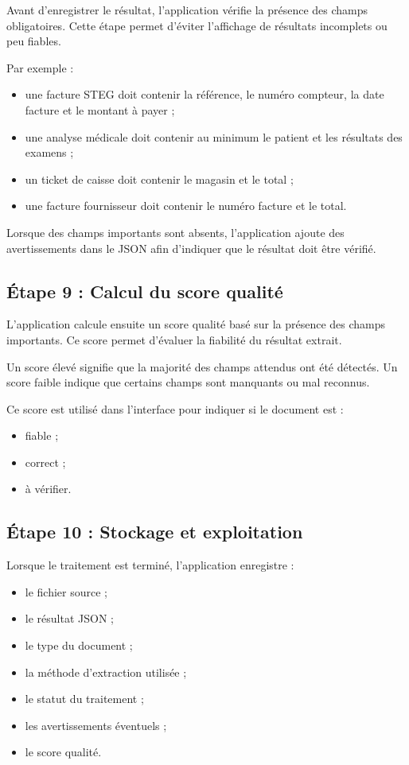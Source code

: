 Avant d'enregistrer le résultat, l'application vérifie la présence des champs obligatoires. Cette étape permet d'éviter l'affichage de résultats incomplets ou peu fiables.

Par exemple :

\begin{itemize}
\item une facture STEG doit contenir la référence, le numéro compteur, la date facture et le montant à payer ;
\item une analyse médicale doit contenir au minimum le patient et les résultats des examens ;
\item un ticket de caisse doit contenir le magasin et le total ;
\item une facture fournisseur doit contenir le numéro facture et le total.
\end{itemize}

Lorsque des champs importants sont absents, l'application ajoute des avertissements dans le JSON afin d'indiquer que le résultat doit être vérifié.

\subsection{Étape 9 : Calcul du score qualité}

L'application calcule ensuite un score qualité basé sur la présence des champs importants. Ce score permet d'évaluer la fiabilité du résultat extrait.

Un score élevé signifie que la majorité des champs attendus ont été détectés. Un score faible indique que certains champs sont manquants ou mal reconnus.

Ce score est utilisé dans l'interface pour indiquer si le document est :

\begin{itemize}
\item fiable ;
\item correct ;
\item à vérifier.
\end{itemize}

\subsection{Étape 10 : Stockage et exploitation}

Lorsque le traitement est terminé, l'application enregistre :

\begin{itemize}
\item le fichier source ;
\item le résultat JSON ;
\item le type du document ;
\item la méthode d'extraction utilisée ;
\item le statut du traitement ;
\item les avertissements éventuels ;
\item le score qualité.
\end{itemize}

